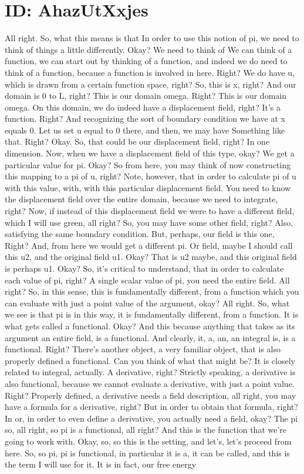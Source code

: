 \documentclass[10pt]{article}
\begin{document}
{\section*{ID: AhazUtXxjes}
All right. So, what this means is that In order to use this notion of pi, we need to think of things a little differently. Okay? We need to think of We can think of a function, we can start out by thinking of a function, and indeed we do need to think of a function, because a function is involved in here. Right? We do have u, which is drawn from a certain function space, right? So, this is x, right? And our domain is 0 to L, right? This is our domain omega. Right? This is our domain omega. On this domain, we do indeed have a displacement field, right? It's a function. Right? And recognizing the sort of boundary condition we have at x equals 0. Let us set u equal to 0 there, and then, we may have Something like that. Right? Okay. So, that could be our displacement field, right? In one dimension. Now, when we have a displacement field of this type, okay? We get a particular value for pi. Okay? So from here, you may think of now constructing this mapping to a pi of u, right? Note, however, that in order to calculate pi of u with this value, with, with this particular displacement field. You need to know the displacement field over the entire domain, because we need to integrate, right? Now, if instead of this displacement field we were to have a different field, which I will use green, all right? So, you may have some other field, right? Also, satisfying the same boundary condition. But, perhaps, our field is this one, Right? And, from here we would get a different pi. Or field, maybe I should call this u2, and the original field u1. Okay? That is u2 maybe, and this original field is perhaps u1. Okay? So, it's critical to understand, that in order to calculate each value of pi, right? A single scalar value of pi, you need the entire field. All right? So, in this sense, this is fundamentally different, from a function which you can evaluate with just a point value of the argument, okay? All right. So, what we see is that pi is in this way, it is fundamentally different, from a function. It is what gets called a functional. Okay? And this because anything that takes as its argument an entire field, is a functional. And clearly, it, a, an, an integral is, is a functional. Right? There's another object, a very familiar object, that is also properly defined a functional. Can you think of what that might be? It is closely related to integral, actually. A derivative, right? Strictly speaking, a derivative is also functional, because we cannot evaluate a derivative, with just a point value. Right? Properly defined, a derivative needs a field description, all right, you may have a formula for a derivative, right? But in order to obtain that formula, right? In or, in order to even define a derivative, you actually need a field, okay? The pi so, all right, so pi is a functional, all right? And this is the function that we're going to work with. Okay, so, so this is the setting, and let's, let's proceed from here. So, so pi, pi is functional, in particular it is a, it can be called, and this is the term I will use for it. It is in fact, our free energy }
\end{document}
